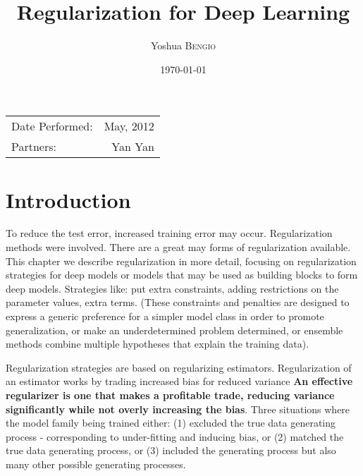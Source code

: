 \documentclass{article}
\title{Regularization for Deep Learning} %
\author{Yoshua  \textsc{Bengio}} %
\date{\today} %
\begin{document}
\maketitle %

\begin{center}
\begin{tabular}{l r}
Date Performed: & May, 2012 \\ %
Partners: & Yan Yan \\ %
\end{tabular}
\end{center}



\section{Introduction}

To reduce the test error, increased training error may occur. 
Regularization methods were involved. 
There are a great may forms of regularization available. 
This chapter we describe regularization in more detail, focusing on regularization strategies for deep models or models that may be used as building blocks to form deep models.
Strategies like: put extra constraints, adding restrictions on the parameter values, extra terms. 
(These constraints and penalties are designed to express a generic preference for a simpler model class in order to promote generalization, or make an underdetermined problem determined, or ensemble methods combine multiple hypotheses that explain the training data).

Regularization strategies are based on regularizing estimators. Regularization of an estimator works by trading increased bias for reduced variance
\textbf{An effective regularizer is one that makes a profitable trade, reducing variance significantly while not overly increasing the bias}.
Three situations where the model family being trained either:
(1) excluded the true data generating process - corresponding to under-fitting and inducing bias, or 
(2) matched the true data generating process, or
(3) included the generating process but also many other possible generating processes.
\end{document}
